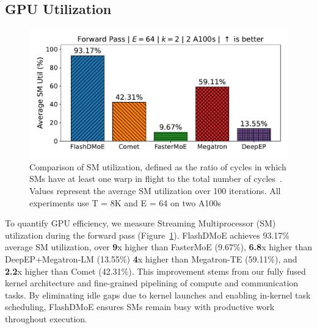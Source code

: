 \subsection{GPU Utilization}\label{subsec:gpu-utilization}
\begin{figure}[!ht]
    \centering
    \centering
    \includegraphics[width=0.8\linewidth, keepaspectratio]{figures/sm_util}
    \caption{Comparison of SM utilization, defined as the ratio of cycles in which SMs
    have at least one warp in flight
    to the total number of cycles~\cite{nsight-metrics}.
    Values represent the average SM utilization over 100 iterations.
    All experiments use T = 8K and E = 64 on two A100s}
    \label{fig:smu}
\end{figure}
To quantify GPU efficiency, we measure Streaming Multiprocessor (SM) utilization during the forward pass (Figure~\ref{fig:smu}).
FlashDMoE achieves 93.17\% average SM utilization,
over \textbf{9}x higher than FasterMoE (9.67\%), \textbf{6.8}x higher than DeepEP+Megatron-LM (13.55\%)
\textbf{4}x higher than Megatron-TE (59.11\%), and
\textbf{2.2}x higher than Comet (42.31\%).
This improvement stems from our fully fused kernel architecture and
fine-grained pipelining of compute and communication tasks.
By eliminating idle gaps due to kernel launches and enabling in-kernel task scheduling,
FlashDMoE ensures SMs remain busy with productive work throughout execution.

